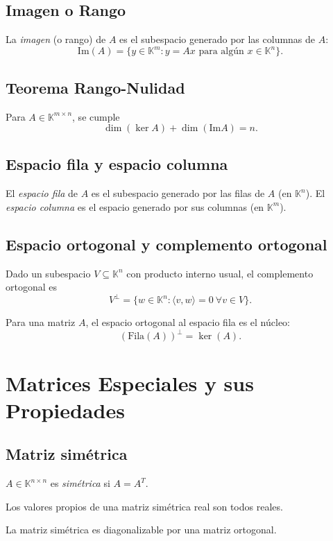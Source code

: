 \documentclass{article}
\begin{document}
\subsection{Imagen o Rango}
La \emph{imagen} (o rango) de \( A \) es el subespacio generado por las columnas de \( A \):
\[
\mathrm{Im}(A) = \{ y \in \mathbb{K}^m : y = Ax \text{ para algún } x \in \mathbb{K}^n \}.
\]


\subsection{Teorema Rango-Nulidad}
Para \( A \in \mathbb{K}^{m \times n} \), se cumple
\[
\dim(\ker A) + \dim(\mathrm{Im} A) = n.
\]


\subsection{Espacio fila y espacio columna}
El \emph{espacio fila} de \( A \) es el subespacio generado por las filas de \( A \) (en \(\mathbb{K}^n\)).
El \emph{espacio columna} es el espacio generado por sus columnas (en \(\mathbb{K}^m\)).


\subsection{Espacio ortogonal y complemento ortogonal}
Dado un subespacio \( V \subseteq \mathbb{K}^n \) con producto interno usual, el complemento ortogonal es
\[
V^\perp = \{ w \in \mathbb{K}^n : \langle v, w \rangle = 0 \ \forall v \in V \}.
\]


Para una matriz \( A \), el espacio ortogonal al espacio fila es el núcleo:
\[
(\mathrm{Fila}(A))^\perp = \ker(A).
\]


\section{Matrices Especiales y sus Propiedades}

\subsection{Matriz simétrica}
\( A \in \mathbb{K}^{n \times n} \) es \emph{simétrica} si \( A = A^T \).


Los valores propios de una matriz simétrica real son todos reales.



La matriz simétrica es diagonalizable por una matriz ortogonal.
\end{document}
